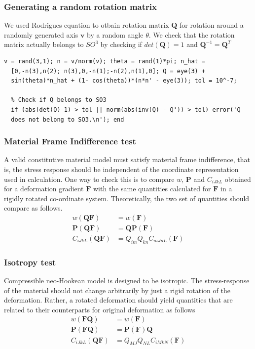 \documentclass[../main.tex]{subfiles}
\begin{document}
\subsubsection{Generating a random rotation matrix}
We used Rodrigues equation to otbain rotation matrix $\mathbf{Q}$ for
rotation around a randomly generated axis $\mathbf{v}$ by a random
angle $\theta$. We check that the rotation matrix actually belongs to
$SO^3$ by checking if $det(\mathbf{Q}) = 1$ and
$\mathbf{Q}^{-1} =\mathbf{Q}^T $
\begin{lstlisting}[style = Matlab-editor]
  v = rand(3,1); n = v/norm(v); theta = rand(1)*pi; n_hat =
  [0,-n(3),n(2); n(3),0,-n(1);-n(2),n(1),0]; Q = eye(3) +
  sin(theta)*n_hat + (1- cos(theta))*(n*n' - eye(3)); tol = 10^-7;

  % Check if Q belongs to SO3
  if (abs(det(Q)-1) > tol || norm(abs(inv(Q) - Q')) > tol) error('Q
  does not belong to SO3.\n'); end
\end{lstlisting}

\subsubsection{Material Frame Indifference test}
\label{sec:mfi}
A valid constitutive material model must satisfy material frame
indifference, that is, the stress response should be independent of
the coordinate representation used in calculation. One way to check
this is to compare $w$, $\mathbf{P}$ and $C_{iJkL}$ obtained for a
deformation gradient $\mathbf{F}$ with the same quantities calculated
for $\mathbf{F}$ in a rigidly rotated co-ordinate
system. Theoretically, the two set of quantities should compare as
follows.
\begin{align*}
  w(\mathbf{QF}) &= w(\mathbf{F})\\
  \mathbf{P}(\mathbf{QF}) &= \mathbf{Q}\mathbf{P}(\mathbf{F})\\
  C_{iJkL}(\mathbf{QF}) &= Q_{im}Q_{kn}C_{mJnL}(\mathbf{F})
\end{align*}

\subsubsection{Isotropy test}
\label{sec:isotropy}
Compressible neo-Hookean model is designed to be isotropic. The
stress-response of the material should not change arbitrarily by just
a rigid rotation of the deformation. Rather, a rotated deformation
should yield quantities that are related to their counterparts for
original deformation as follows
\begin{align*}
  w(\mathbf{FQ}) &= w(\mathbf{F})\\
  \mathbf{P}(\mathbf{FQ}) &= \mathbf{P}(\mathbf{F})\mathbf{Q}\\
  C_{iJkL}(\mathbf{QF}) &= Q_{MJ}Q_{NL}C_{iMkN}(\mathbf{F})
\end{align*}
\end{document}
